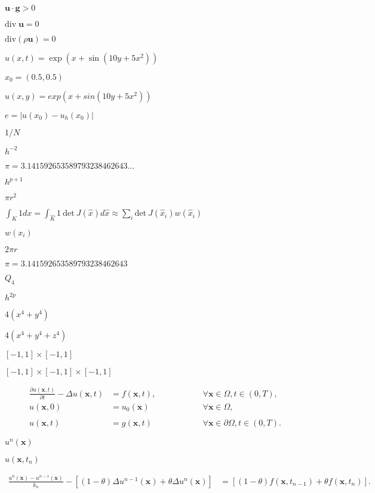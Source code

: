 \documentclass{article}
\begin{document}
$\mathbf u \cdot \mathbf g > 0$
\pagebreak

$\textrm{div}\;\mathbf u=0$
\pagebreak

$\textrm{div}(\rho\mathbf u)=0$
\pagebreak

$u(x,t)=\exp(x+\sin(10y+5x^2))$
\pagebreak

$x_0=(0.5,0.5)$
\pagebreak

$u(x,y)=exp(x+sin(10y+5x^2))$
\pagebreak

$e=|u(x_0)-u_h(x_0)|$
\pagebreak

$1/N$
\pagebreak

$h^{-2}$
\pagebreak

$\pi=3.141592653589793238462643\ldots$
\pagebreak

$h^{p+1}$
\pagebreak

$\pi r^2$
\pagebreak

$\int_K 1 dx=\int_{\hat K} 1 \ \textrm{det}\ J(\hat x) d\hat x \approx \sum_i \textrm{det} \ J(\hat x_i)w(\hat x_i)$
\pagebreak

$w(x_i)$
\pagebreak

$2\pi r$
\pagebreak

$\pi=3.141592653589793238462643$
\pagebreak

$Q_4$
\pagebreak

$h^{2p}$
\pagebreak

$4(x^4+y^4)$
\pagebreak

$4(x^4+y^4+z^4)$
\pagebreak

$[-1,1]\times [-1,1]$
\pagebreak

$[-1,1] \times [-1,1] \times [-1,1]$
\pagebreak

\begin{align*} \frac{\partial u(\mathbf x, t)}{\partial t} - \Delta u(\mathbf x, t) &= f(\mathbf x, t), \qquad\qquad && \forall \mathbf x \in \Omega, t\in (0,T), \\ u(\mathbf x, 0) &= u_0(\mathbf x) && \forall \mathbf x \in \Omega, \\ \\ u(\mathbf x, t) &= g(\mathbf x,t) && \forall \mathbf x \in \partial\Omega, t \in (0,T). \end{align*}
\pagebreak

$u^n(\mathbf x)$
\pagebreak

$u(\mathbf x, t_n)$
\pagebreak

\begin{align*} \frac{u^n(\mathbf x)-u^{n-1}(\mathbf x)}{k_n} - \left[ (1-\theta)\Delta u^{n-1}(\mathbf x) + \theta\Delta u^n(\mathbf x) \right] &= \left[ (1-\theta)f(\mathbf x, t_{n-1}) + \theta f(\mathbf x, t_n) \right]. \end{align*}
\pagebreak
\end{document}
